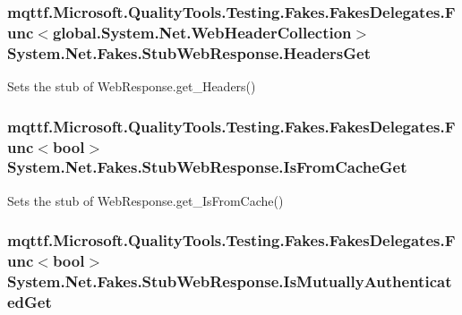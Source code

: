 \hypertarget{class_system_1_1_net_1_1_fakes_1_1_stub_web_response_aababe088e569e27112ab1692050dff30}{
\subsubsection[{Headers\-Get}]{\setlength{\rightskip}{0pt plus 5cm}mqttf.\-Microsoft.\-Quality\-Tools.\-Testing.\-Fakes.\-Fakes\-Delegates.\-Func$<$global.\-System.\-Net.\-Web\-Header\-Collection$>$ System.\-Net.\-Fakes.\-Stub\-Web\-Response.\-Headers\-Get}}\label{class_system_1_1_net_1_1_fakes_1_1_stub_web_response_aababe088e569e27112ab1692050dff30}


Sets the stub of Web\-Response.\-get\-\_\-\-Headers()

\hypertarget{class_system_1_1_net_1_1_fakes_1_1_stub_web_response_a827255d8a3d5071335b8c98a79715f8f}{
\subsubsection[{Is\-From\-Cache\-Get}]{\setlength{\rightskip}{0pt plus 5cm}mqttf.\-Microsoft.\-Quality\-Tools.\-Testing.\-Fakes.\-Fakes\-Delegates.\-Func$<$bool$>$ System.\-Net.\-Fakes.\-Stub\-Web\-Response.\-Is\-From\-Cache\-Get}}\label{class_system_1_1_net_1_1_fakes_1_1_stub_web_response_a827255d8a3d5071335b8c98a79715f8f}


Sets the stub of Web\-Response.\-get\-\_\-\-Is\-From\-Cache()

\hypertarget{class_system_1_1_net_1_1_fakes_1_1_stub_web_response_a8a0b739cd38fcaf36ced59080dd861c8}{
\subsubsection[{Is\-Mutually\-Authenticated\-Get}]{\setlength{\rightskip}{0pt plus 5cm}mqttf.\-Microsoft.\-Quality\-Tools.\-Testing.\-Fakes.\-Fakes\-Delegates.\-Func$<$bool$>$ System.\-Net.\-Fakes.\-Stub\-Web\-Response.\-Is\-Mutually\-Authenticated\-Get}}\label{class_system_1_1_net_1_1_fakes_1_1_stub_web_response_a8a0b739cd38fcaf36ced59080dd861c8}


